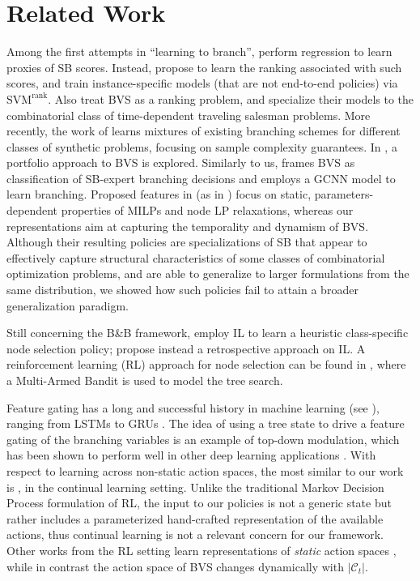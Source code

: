 \documentclass[letterpaper]{article} %
\begin{document}
\section{Related Work}
\label{sec:related}

Among the first attempts in ``learning to branch'', \citeauthor{Alvarez2017} perform regression to learn proxies of SB scores.
Instead, \citeauthor{Khalil2016} propose to learn the ranking associated with such scores, and train instance-specific models (that are not end-to-end policies) via $\text{SVM}^{\text{rank}}$.
Also \citeauthor{hansknecht2018cuts} treat BVS as a ranking problem, and specialize their models to the combinatorial class of time-dependent traveling salesman problems.
More recently, the work of \citeauthor{BalcanICML2018} learns mixtures of existing branching schemes for different classes of synthetic problems, focusing on sample complexity guarantees.
In \citeauthor{liberto_dash_2016}, a portfolio approach to BVS is explored.
Similarly to us, \citeauthor{NIPS2019_9690} frames BVS as classification of SB-expert branching decisions and employs a GCNN model to learn branching.
Proposed features in \citeauthor{NIPS2019_9690} (as in \citeauthor{Alvarez2017,Khalil2016}) focus on static, parameters-dependent properties of MILPs and node LP relaxations, whereas our representations aim at capturing the temporality and dynamism of BVS.
Although their resulting policies are specializations of SB that appear to effectively capture structural characteristics of some classes of combinatorial optimization problems, and are able to generalize to larger formulations from the same distribution, we showed how such policies fail to attain a broader generalization paradigm.

Still concerning the B\&B framework, \citeauthor{LearningToSearch} employ IL to learn a heuristic class-specific node selection policy; \citeauthor{song2018learning} propose instead a retrospective approach on IL.
A reinforcement learning (RL) approach for node selection can be found in \citeauthor{sabharwal_guiding_2012}, where a Multi-Armed Bandit is used to model the tree search.

Feature gating has a long and successful history in machine learning (see \citeauthor{FeatureGatingSurvey}), ranging from LSTMs \cite{LSTM} to GRUs \cite{GRU}.
The idea of using a tree state to drive a feature gating of the branching variables is an example of top-down modulation, which has been shown to perform well in other deep learning applications \cite{BeyondSkip, TopDownPyramid, ExGate}.
With respect to learning across non-static action spaces, the most similar to our work is \citeauthor{ChangingActionSetLifeLong}, in the continual learning setting.
Unlike the traditional Markov Decision Process formulation of RL, the input to our policies is not a generic state but rather includes a parameterized hand-crafted representation of the available actions, thus continual learning is not a relevant concern for our framework.
Other works from the RL setting learn representations of \emph{static} action spaces \cite{LargeDiscreteRLActionSpaces, LearningTheActionSpace}, while in contrast the action space of BVS changes dynamically with $|\mathcal{C}_t|$.
\end{document}
